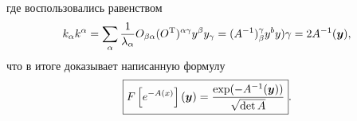 где воспользовались равенством
\begin{equation*}
    k_\alpha k^\alpha = \sum_\alpha \frac{1}{\lambda_\alpha} O_{\beta \alpha} (O^{\text{T}})^{\alpha \gamma} y^\beta y_\gamma = (A^{-1})_\beta^\gamma y^b y)\gamma = 2 A^{-1} (\mbox{\boldmath $y$}),
\end{equation*}
что в итоге доказывает написанную формулу
\begin{equation*}
    \boxed{
    F\left[e^{-A(x)}\right](\mbox{\boldmath $y$})
     =     \frac{\exp(-A^{-1}(\mbox{\boldmath $y$}))}{\sqrt{\det A}}
     }.
\end{equation*}